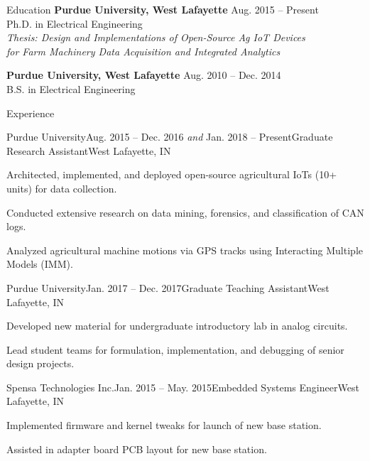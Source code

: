 \documentclass{resume}
\begin{document}
  \begin{rSection}{Education}
    {\bf Purdue University, West Lafayette} \hfill {Aug. 2015 -- Present}
    \\ 
    {Ph.D. in Electrical Engineering} \\
    \textit{Thesis: Design and Implementations of Open-Source Ag IoT Devices \\
      for Farm Machinery Data Acquisition and Integrated Analytics}

    {\bf Purdue University, West Lafayette} \hfill {Aug. 2010 -- Dec. 2014}
    \\ 
    {B.S. in Electrical Engineering} \\
  \end{rSection}

  \begin{rSection}{Experience}
    \begin{rSubsection}{Purdue University}{Aug. 2015 -- Dec. 2016 \textit{and}
        Jan. 2018 -- Present}{Graduate Research Assistant}{West Lafayette, IN}
      \item Architected, implemented, and deployed open-source agricultural
        IoTs (10+ units) for data collection.
      \item Conducted extensive research on data mining, forensics, and
        classification of CAN logs. 
      \item Analyzed agricultural machine motions via GPS tracks using
        Interacting Multiple Models (IMM). 
    \end{rSubsection}

    \begin{rSubsection}{Purdue University}{Jan. 2017 --
        Dec. 2017}{Graduate Teaching Assistant}{West Lafayette, IN}
      \item Developed new material for undergraduate introductory lab in analog
        circuits. 
      \item Lead student teams for formulation, implementation, and debugging
        of senior design projects. 
    \end{rSubsection}

    \begin{rSubsection}{Spensa Technologies Inc.}{Jan. 2015 --
        May. 2015}{Embedded Systems Engineer}{West Lafayette, IN}
      \item Implemented firmware and kernel tweaks for launch of new base
        station.
      \item Assisted in adapter board PCB layout for new base station. 
    \end{rSubsection}


\end{rSection}
\end{document}
